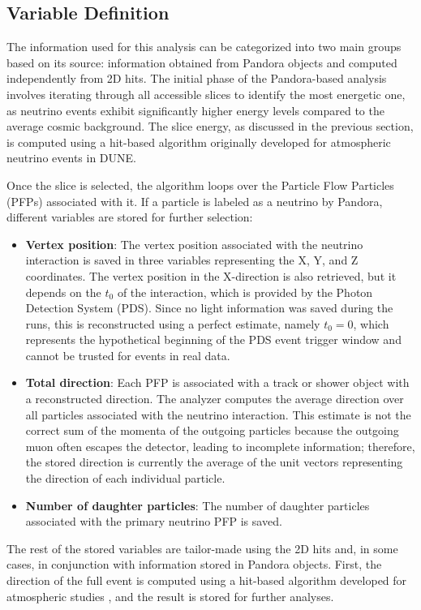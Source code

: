 \subsection{Variable Definition} \label{chap:Analyzer}
The information used for this analysis can be categorized into two main groups based on its source: information obtained from Pandora objects and computed independently from 2D hits. The initial phase of the Pandora-based analysis involves iterating through all accessible slices to identify the most energetic one, as neutrino events exhibit significantly higher energy levels compared to the average cosmic background. The slice energy, as discussed in the previous section, is computed using a hit-based algorithm originally developed for atmospheric neutrino events in DUNE. 

Once the slice is selected, the algorithm loops over the Particle Flow Particles (PFPs) associated with it. If a particle is labeled as a neutrino by Pandora, different variables are stored for further selection:
\begin{itemize}
    \item \textbf{Vertex position}: The vertex position associated with the neutrino interaction is saved in three variables representing the X, Y, and Z coordinates. The vertex position in the X-direction is also retrieved, but it depends on the $t_0$ of the interaction, which is provided by the Photon Detection System (PDS). Since no light information was saved during the runs, this is reconstructed using a perfect estimate, namely $t_0 = 0$, which represents the hypothetical beginning of the PDS event trigger window and cannot be trusted for events in real data.
    \item \textbf{Total direction}: Each PFP is associated with a track or shower object with a reconstructed direction. The analyzer computes the average direction over all particles associated with the neutrino interaction. This estimate is not the correct sum of the momenta of the outgoing particles because the outgoing muon often escapes the detector, leading to incomplete information; therefore, the stored direction is currently the average of the unit vectors representing the direction of each individual particle. 
    \item \textbf{Number of daughter particles}: The number of daughter particles associated with the primary neutrino PFP is saved. 
\end{itemize}



The rest of the stored variables are tailor-made using the 2D hits and, in some cases, in conjunction with information stored in Pandora objects. First, the direction of the full event is computed using a hit-based algorithm developed for atmospheric studies \cite{DUNE:2026yly}, and the result is stored for further analyses. %

